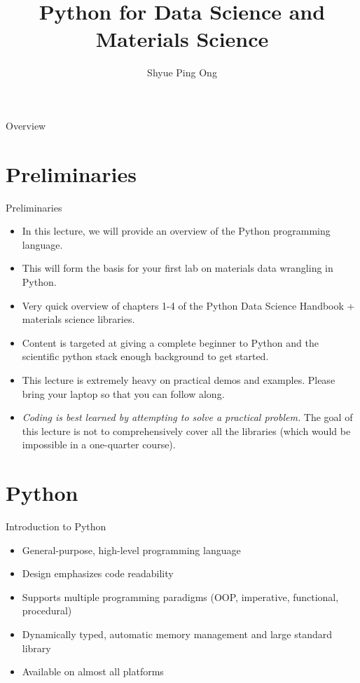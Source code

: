 \documentclass[aspectratio=169]{beamer}
\title[Python for Data Science and Materials Science]{Python for Data Science and Materials Science}
\author{Shyue Ping Ong}
\institute[UCSD]{Aiiso Yufeng Li Family Department of Chemical and Nano Engineering\\
University of California, San Diego\\\url{http://materialsvirtuallab.org}}
\date{}
\begin{document}
    \begin{frame}
        \titlepage %
    \end{frame}


    \begin{frame}{Overview}
        \tableofcontents
    \end{frame}


    \section{Preliminaries}

    \begin{frame}{Preliminaries}
        \begin{itemize}
            \item In this lecture, we will provide an overview of the Python programming language.
            \item This will form the basis for your first lab on materials data wrangling in Python.
            \item Very quick overview of chapters 1-4 of the Python Data Science Handbook\cite{vanderplasPythonDataScience2016} + materials science libraries.
            \item Content is targeted at giving a complete beginner to Python and the scientific python stack enough background to get started.
            \item This lecture is extremely heavy on practical demos and examples. Please bring your laptop so that you can follow along.
            \item \textit{Coding is best learned by attempting to solve a practical problem.} The goal of this lecture is not to comprehensively cover all the libraries (which would be impossible in a one-quarter course).
        \end{itemize}
    \end{frame}


    \section{Python}

    \begin{frame}{Introduction to Python}
        \begin{itemize}
            \item General-purpose, high-level programming language
            \item Design emphasizes code readability
            \item Supports multiple programming paradigms (OOP, imperative, functional, procedural)
            \item Dynamically typed, automatic memory management and large standard library
            \item Available on almost all platforms
        \end{itemize}

    \end{frame}
\end{document}
